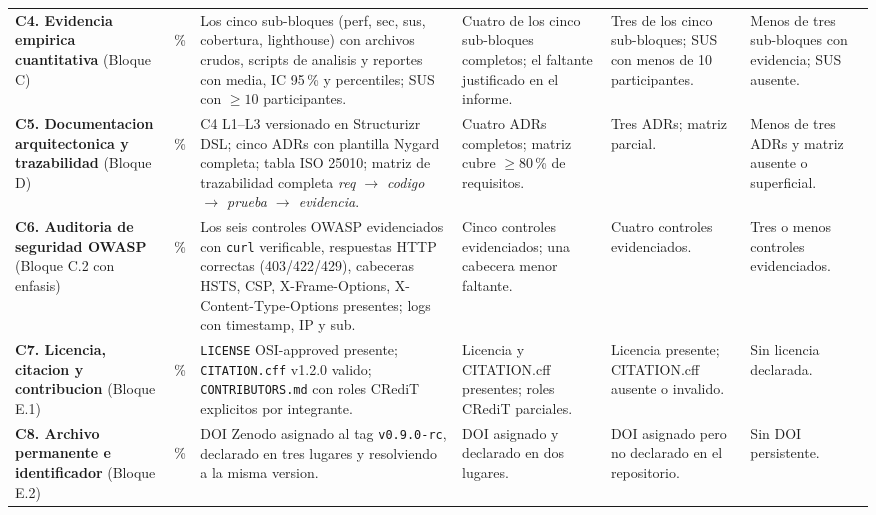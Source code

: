 \documentclass[11pt,a4paper]{article}
\begin{document}
{\begin{longtable}{|L{3.0cm}|C{0.9cm}|L{2.5cm}|L{2.5cm}|L{2.5cm}|L{2.3cm}|}
\textbf{C4. Evidencia empirica cuantitativa} (Bloque C) &
\,\% &
Los cinco sub-bloques (perf, sec, sus, cobertura, lighthouse) con archivos crudos, scripts de analisis y reportes con media, IC 95\,\% y percentiles; SUS con $\geq 10$ participantes. &
Cuatro de los cinco sub-bloques completos; el faltante justificado en el informe. &
Tres de los cinco sub-bloques; SUS con menos de 10 participantes. &
Menos de tres sub-bloques con evidencia; SUS ausente. \\

\textbf{C5. Documentacion arquitectonica y trazabilidad} (Bloque D) &
\,\% &
C4 L1--L3 versionado en Structurizr DSL; cinco ADRs con plantilla Nygard completa; tabla ISO 25010; matriz de trazabilidad completa \emph{req $\rightarrow$ codigo $\rightarrow$ prueba $\rightarrow$ evidencia}. &
Cuatro ADRs completos; matriz cubre $\geq 80$\,\% de requisitos. &
Tres ADRs; matriz parcial. &
Menos de tres ADRs y matriz ausente o superficial. \\

\textbf{C6. Auditoria de seguridad OWASP} (Bloque C.2 con enfasis) &
\,\% &
Los seis controles OWASP evidenciados con \texttt{curl} verificable, respuestas HTTP correctas (403/422/429), cabeceras HSTS, CSP, X-Frame-Options, X-Content-Type-Options presentes; logs con timestamp, IP y sub. &
Cinco controles evidenciados; una cabecera menor faltante. &
Cuatro controles evidenciados. &
Tres o menos controles evidenciados. \\

\textbf{C7. Licencia, citacion y contribucion} (Bloque E.1) &
\,\% &
\texttt{LICENSE} OSI-approved presente; \texttt{CITATION.cff} v1.2.0 valido; \texttt{CONTRIBUTORS.md} con roles CRediT explicitos por integrante. &
Licencia y CITATION.cff presentes; roles CRediT parciales. &
Licencia presente; CITATION.cff ausente o invalido. &
Sin licencia declarada. \\

\textbf{C8. Archivo permanente e identificador} (Bloque E.2) &
\,\% &
DOI Zenodo asignado al tag \texttt{v0.9.0-rc}, declarado en tres lugares y resolviendo a la misma version. &
DOI asignado y declarado en dos lugares. &
DOI asignado pero no declarado en el repositorio. &
Sin DOI persistente. \\


\end{longtable}}
\end{document}
